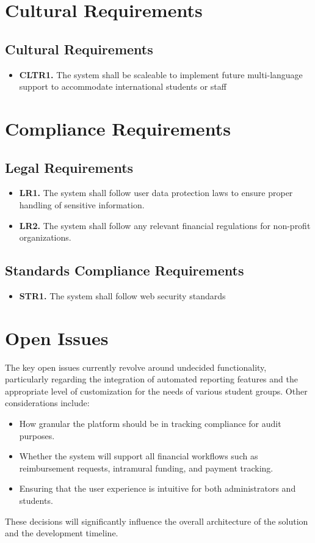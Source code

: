 \documentclass[12pt]{article}
\begin{document}
\section{Cultural Requirements}
\subsection{Cultural Requirements}
\begin{itemize}
    \item \textbf{CLTR1. } The system shall be scaleable to implement future multi-language support to accommodate international students or staff 
\end{itemize}

\section{Compliance Requirements}
\subsection{Legal Requirements}
\begin{itemize}
    \item \textbf{LR1. } The system shall follow user data protection laws to ensure proper handling of sensitive information.
    \item \textbf{LR2. } The system shall follow any relevant financial regulations for non-profit organizations.
\end{itemize}
\subsection{Standards Compliance Requirements}
\begin{itemize}
    \item \textbf{STR1. } The system shall follow web security standards
\end{itemize}

\section{Open Issues}
The key open issues currently revolve around undecided functionality, particularly regarding the integration of automated reporting features and the appropriate level of customization for the needs of various student groups. Other considerations include:
\begin{itemize}
    \item How granular the platform should be in tracking compliance for audit purposes.
    \item Whether the system will support all financial workflows such as reimbursement requests, intramural funding, and payment tracking.
    \item Ensuring that the user experience is intuitive for both administrators and students.
\end{itemize}
These decisions will significantly influence the overall architecture of the solution and the development timeline.
\end{document}
